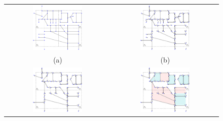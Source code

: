  \begin{figure}
     \centering
     \begin{tabular}{cc}
         \includegraphics[width=0.49\textwidth]{chapterExtension/model/input/input} &
         \includegraphics[width=0.49\textwidth]{chapterExtension/model/a/a} \\
         (a) & (b) \\
         \includegraphics[width=0.49\textwidth]{chapterExtension/model/b/b} &
         \includegraphics[width=0.49\textwidth]{chapterExtension/model/c/c} \\

\end{tabular}
\end{figure}
